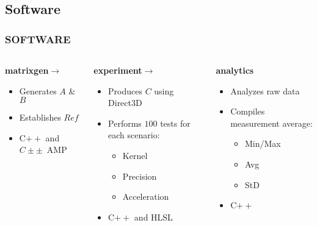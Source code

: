 \subsection{Software}
\begin{frame}
\frametitle{SOFTWARE}

\begin{columns}[T]
  \begin{column}{0.33\textwidth}
    \textbf{matrixgen}\hfill$\rightarrow$\hfill
    \begin{itemize}
    \item Generates $A$ \& $B$
    \item Establishes $Ref$
    \item C$++$ and $C±±$~AMP
    \end{itemize}
  \end{column}
  \begin{column}{0.33\textwidth}
    \textbf{experiment}\hfill$\rightarrow$\hfill
    \begin{itemize}
    \item Produces $C$ using Direct3D
    \item Performs $100$ tests for each scenario:
      \begin{itemize}
      \item Kernel
      \item Precision\footnotemark
      \item Acceleration
      \end{itemize}
    \item C$++$ and HLSL
    \end{itemize}
  \end{column}
  \begin{column}{0.33\textwidth}
    \textbf{analytics}
    \begin{itemize}
    \item Analyzes raw data
    \item Compiles measurement average:
      \begin{itemize}
      \item Min/Max
      \item Avg
      \item StD
      \end{itemize}
    \item C$++$
    \end{itemize}
  \end{column}
\end{columns}


\end{frame}
